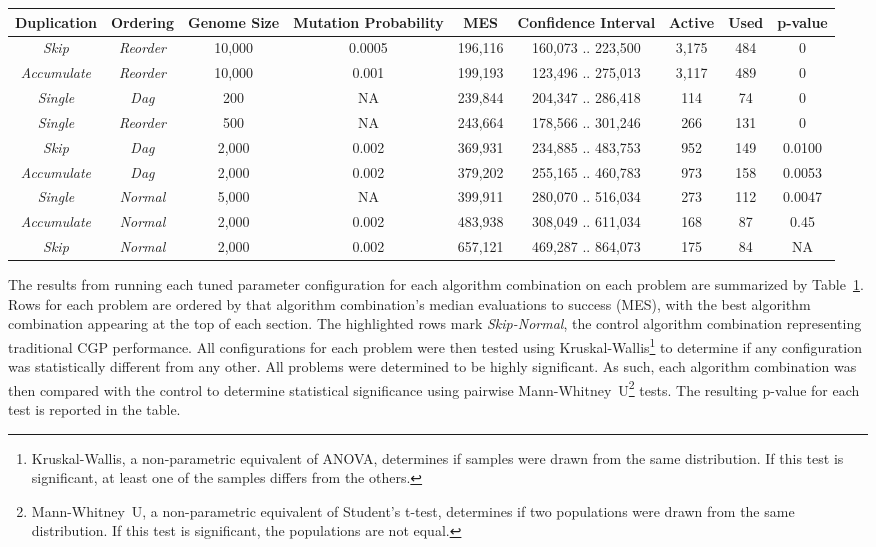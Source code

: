 \documentclass[journal]{IEEEtran}
\begin{document}
\begin{table}
\begin{tabular}{|c|c|c|c|c|c|c|c|c|}
\textbf{Duplication} & \textbf{Ordering} & \textbf{Genome Size} & \textbf{Mutation Probability} & \textbf{MES} & \textbf{Confidence Interval} & \textbf{Active} & \textbf{Used} & \textbf{p-value} \\ \hline
\emph{Skip} & \emph{Reorder}      & 10,000 & 0.0005& 196,116 & 160,073 .. 223,500  & 3,175 & 484 & 0  \\ \hline
\emph{Accumulate} & \emph{Reorder}& 10,000 & 0.001 & 199,193 & 123,496 .. 275,013 & 3,117 & 489 & 0  \\ \hline
\emph{Single} & \emph{Dag}        &   200  & NA    & 239,844 & 204,347 .. 286,418 & 114 & 74 & 0 \\ \hline
\emph{Single} & \emph{Reorder}    & 500    & NA    & 243,664 & 178,566 .. 301,246 & 266 & 131 & 0 \\ \hline
\emph{Skip} & \emph{Dag}          & 2,000  & 0.002 & 369,931 & 234,885 .. 483,753 & 952 & 149 & 0.0100 \\ \hline
\emph{Accumulate} & \emph{Dag}    & 2,000  & 0.002 & 379,202 & 255,165 .. 460,783 & 973 & 158 & 0.0053  \\ \hline
\emph{Single} & \emph{Normal}     & 5,000  & NA    & 399,911 & 280,070 .. 516,034 & 273 & 112 & 0.0047 \\ \hline
\emph{Accumulate} & \emph{Normal} & 2,000  & 0.002 & 483,938 & 308,049 .. 611,034 & 168 & 87 & 0.45 \\ \hline
\rowcolor{Gray}
\emph{Skip} & \emph{Normal}       & 2,000  & 0.002 & 657,121 & 469,287 .. 864,073 & 175 & 84 & NA \\ \hline

	\end{tabular}
	\label{tab:results}
\end{table}

The results from running each tuned parameter configuration for each algorithm
combination on each problem are summarized by Table~\ref{tab:results}.
Rows for each problem are ordered by that algorithm combination's median evaluations to
success (MES), with the best algorithm combination appearing at the top of each section.
The highlighted rows mark \emph{Skip-Normal}, the control algorithm combination
representing traditional CGP performance.  All configurations for each problem
were then tested using
Kruskal-Wallis\footnote{Kruskal-Wallis, a non-parametric equivalent of ANOVA, determines
if samples were drawn from the same distribution.  If this test is significant, at
least one of the samples differs from the others.}
to determine if any configuration was
statistically different from any other.  All problems were determined to be highly significant.
As such, each algorithm combination was then compared with the control
to determine statistical significance using pairwise
Mann-Whitney~U\footnote{Mann-Whitney~U, a non-parametric equivalent of Student's t-test,
determines if two populations were drawn from the same distribution.  If this test is significant,
the populations are not equal.}
tests. The
resulting p-value for each test is reported in the table.
\end{document}
